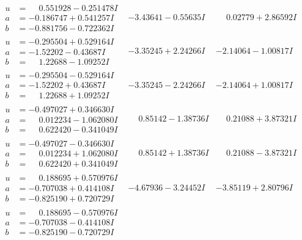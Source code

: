 \documentclass[1p]{elsarticle_modified}
\theoremstyle{definition}
\begin{document}
$$\begin{array}{c|c|c}
\begin{aligned}
u &= \phantom{-}0.551928 - 0.251478 I \\
a &= -0.186747 + 0.541257 I \\
b &= -0.881756 - 0.722362 I\end{aligned}
 & -3.43641 - 0.55635 I & \phantom{-}0.02779 + 2.86592 I \\ \hline\begin{aligned}
u &= -0.295504 + 0.529164 I \\
a &= -1.52202 - 0.43687 I \\
b &= \phantom{-}1.22688 - 1.09252 I\end{aligned}
 & -3.35245 + 2.24266 I & -2.14064 - 1.00817 I \\ \hline\begin{aligned}
u &= -0.295504 - 0.529164 I \\
a &= -1.52202 + 0.43687 I \\
b &= \phantom{-}1.22688 + 1.09252 I\end{aligned}
 & -3.35245 - 2.24266 I & -2.14064 + 1.00817 I \\ \hline\begin{aligned}
u &= -0.497027 + 0.346630 I \\
a &= \phantom{-}0.012234 - 1.062080 I \\
b &= \phantom{-}0.622420 - 0.341049 I\end{aligned}
 & \phantom{-}0.85142 - 1.38736 I & \phantom{-}0.21088 + 3.87321 I \\ \hline\begin{aligned}
u &= -0.497027 - 0.346630 I \\
a &= \phantom{-}0.012234 + 1.062080 I \\
b &= \phantom{-}0.622420 + 0.341049 I\end{aligned}
 & \phantom{-}0.85142 + 1.38736 I & \phantom{-}0.21088 - 3.87321 I \\ \hline\begin{aligned}
u &= \phantom{-}0.188695 + 0.570976 I \\
a &= -0.707038 + 0.414108 I \\
b &= -0.825190 + 0.720729 I\end{aligned}
 & -4.67936 - 3.24452 I & -3.85119 + 2.80796 I \\ \hline\begin{aligned}
u &= \phantom{-}0.188695 - 0.570976 I \\
a &= -0.707038 - 0.414108 I \\
b &= -0.825190 - 0.720729 I\end{aligned}

\end{array}$$
\end{document}
